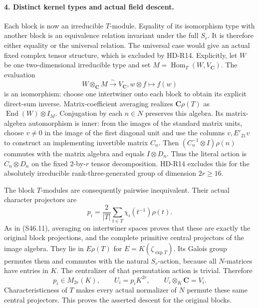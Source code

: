 \paragraph{4. Distinct kernel types and actual field descent.}
Each block is now an irreducible \(T\)-module. Equality
of its isomorphism type with another block is an equivalence
relation invariant under the full \(S_r\). It is therefore
either equality or the universal relation. The universal
case would give an actual fixed complex tensor structure,
which is excluded by HD-R14. Explicitly, let \(W\) be
one two-dimensional irreducible type and set
\(M=\operatorname{Hom}_T(W,V_{\mathbf C})\). The evaluation
\[
       W\otimes_{\mathbf C}M\xrightarrow{\sim}V_{\mathbf C},
                         w\otimes f\longmapsto f(w)
 \tag{S47.6}
\]
is an isomorphism: choose one intertwiner onto each block
to obtain its explicit direct-sum inverse. Matrix-coefficient
averaging realizes \(\mathbf C\rho(T)\) as
\(\operatorname{End}(W)\otimes I_M\). Conjugation by
each \(n\in N\) preserves this algebra. Its matrix-algebra
automorphism is inner: from the images of the standard
matrix units, choose \(v\ne0\) in the image of the first
diagonal unit and use the columns \(v,E'_{21}v\) to
construct an implementing invertible matrix \(C_n\).
Then \((C_n^{-1}\otimes I)\rho(n)\) commutes with the
matrix algebra and equals \(I\otimes D_n\). Thus the
literal action is \(C_n\otimes D_n\) on the fixed
\(2\)-by-\(r\) tensor decomposition. HD-R14 excludes
this for the absolutely irreducible rank-three-generated
group of dimension \(2r\ge16\).

The block \(T\)-modules are consequently pairwise
inequivalent. Their actual character projectors are
\[
 p_i=\frac2{|T|}\sum_{t\in T}\chi_i(t^{-1})\rho(t).
 \tag{S47.7}
\]
As in (S46.11), averaging on intertwiner spaces proves
that these are exactly the original block projections,
and the complete primitive central projectors of the
image algebra. They lie in \(E\rho(T)\) for
\(E=K(\zeta_{\exp T})\). Its Galois group permutes
them and commutes with the natural \(S_r\)-action,
because all \(N\)-matrices have entries in \(K\).
The centralizer of that permutation action is trivial.
Therefore
\[
       p_i\in M_{2r}(K),\qquad U_i=p_iK^{2r},\qquad
       U_i\otimes_K\mathbf C=V_i.
 \tag{S47.8}
\]
Characteristicness of \(T\) makes every actual normalizer
of \(N\) permute these same central projectors. This
proves the asserted descent for the original blocks.

